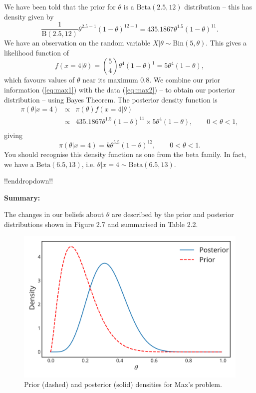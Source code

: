 {We have been told that the prior for $\theta$ is a $\mathrm{Beta}(2.5,12)$ distribution -- this has density given by
    \begin{equation}
    \frac{1}{\mathrm{B}(2.5,12)}\theta^{2.5-1}(1-\theta)^{12-1} = 435.1867\theta^{1.5}(1-\theta)^{11}.
    \label{eq:max1}
    \end{equation}
    We have an observation on the random variable $X|\theta \sim \mathrm{Bin}(5,\theta)$.  This gives a likelihood function of 
    \begin{equation}
    f(x=4|\theta)  = \binom{5}{4} \theta^{4}(1-\theta)^{1} = 5 \theta^{4}(1-\theta),
    \label{eq:max2}
    \end{equation}
    which favours values of $\theta$ near its maximum 0.8.  We combine our prior information (\ref{eq:max1}) with the data (\ref{eq:max2}) -- to obtain our posterior distribution -- using Bayes Theorem.  The posterior density function is
    \begin{eqnarray*}
    \pi(\theta|x=4) &\propto& \pi(\theta)f(x=4|\theta)\\
                    &\propto& 435.1867 \theta^{1.5}(1-\theta)^{11} \times 5 \theta^{4}(1-\theta), \qquad 0<\theta<1,  \\
    \end{eqnarray*}
    giving
    \begin{equation}
    \pi(\theta|x=4) = k \theta^{5.5}(1-\theta)^{12}, \qquad 0<\theta<1.
    \label{eq:max3} 
    \end{equation}
    You should recognise this density function as one from the beta family.  In fact, we have a $\mathrm{Beta}(6.5, 13)$, i.e. $\theta|x=4 \sim \mathrm{Beta}(6.5,13)$.

!!enddropdown!!


\textbf{Summary:}

The changes in our beliefs about $\theta$ are described by the prior and posterior distributions shown in Figure 2.7 and summarised in Table 2.2.
\begin{figure}[h!]

\includegraphics{images/priorposterior2.svg}
\caption{Prior (dashed) and posterior (solid) densities for Max's problem.}



\end{figure}}
